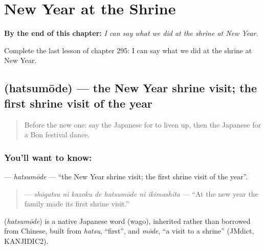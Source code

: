 
\chapter{New Year at the Shrine}
\label{ch:ja-new-year-at-the-shrine}

\begin{chapteropening}
\textbf{By the end of this chapter:} \emph{I can say what we did at the shrine at New Year.}

Complete the last lesson of chapter 295: I can say what we did at the shrine at New Year.
\end{chapteropening}

\section[\texorpdfstring{\ja{はつもうで} (hatsumōde)}{はつもうで (hatsumōde)}]{ (hatsumōde) — the New Year shrine visit; the first shrine visit of the year}

\label{lesson:JA-C295-hatsumoude}



\begin{quote}
Before the new one: say the Japanese for to liven up, then the Japanese for a Bon festival dance.
\end{quote}

\subsection*{You'll want to know: }
\textbf{} — \emph{hatsumōde} — \textquotedblleft{}the New Year shrine visit; the first shrine visit of the year\textquotedblright{}.

\begin{quote}
\textbf{   } — \emph{shōgatsu ni kazoku de hatsumōde ni ikimashita} — \textquotedblleft{}At the new year the family made its first shrine visit.\textquotedblright{}
\end{quote}

\begin{cousinweb}
\textbf{} (\emph{hatsumōde}) is a native Japanese word (wago), inherited rather than borrowed from Chinese, built from \emph{hatsu}, \textquotedblleft{}first\textquotedblright{}, and \emph{mōde}, \textquotedblleft{}a visit to a shrine\textquotedblright{} (JMdict, KANJIDIC2).
\end{cousinweb}

